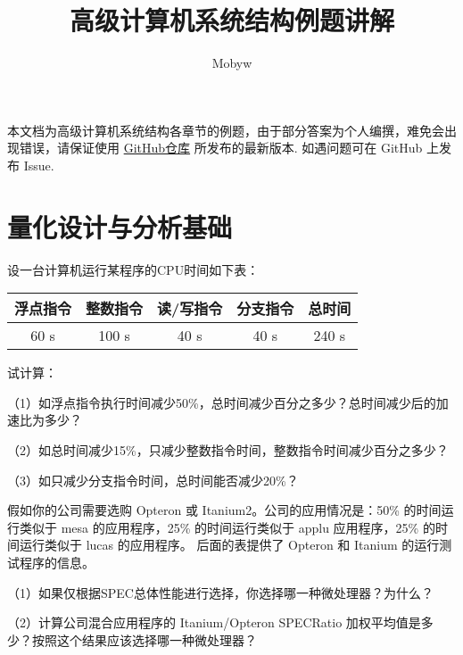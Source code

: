 \documentclass[cn, hazy, blue, normal, 12pt]{elegantnote}
\title{高级计算机系统结构例题讲解}
\author{Mobyw}
\date{\zhtoday}
\begin{document}
\maketitle


\doclicenseThis

本文档为高级计算机系统结构各章节的例题，由于部分答案为个人编撰，难免会出现错误，请保证使用 \href{https://github.com/mobyw/MasterCourseNotes/blob/master/AdvancedComputerSystemArchitecture/AdvancedComputerSystemArchitectureExamples.pdf}{GitHub仓库} 所发布的最新版本. 如遇问题可在 GitHub 上发布 Issue.


\section{量化设计与分析基础}

\begin{exercise}

    设一台计算机运行某程序的CPU时间如下表：

    \begin{table}[htbp]
        \centering
        \notag
        \begin{tabular}{ccccc}
            \hline
            浮点指令 & 整数指令  & 读/写指令 & 分支指令 & 总时间   \\
            \hline
            60 s & 100 s & 40 s  & 40 s & 240 s \\
            \hline
        \end{tabular}
    \end{table}

    试计算：

    （1）如浮点指令执行时间减少50\%，总时间减少百分之多少？总时间减少后的加速比为多少？

    （2）如总时间减少15\%，只减少整数指令时间，整数指令时间减少百分之多少？

    （3）如只减少分支指令时间，总时间能否减少20\%？

\end{exercise}

\begin{solution}[print=true]



\end{solution}

\begin{exercise}

    假如你的公司需要选购 Opteron 或 Itanium2。公司的应用情况是：50\% 的时间运行类似于 mesa 的应用程序，25\% 的时间运行类似于 applu 应用程序，25\% 的时间运行类似于 lucas 的应用程序。 后面的表提供了 Opteron 和 Itanium 的运行测试程序的信息。

    （1）如果仅根据SPEC总体性能进行选择，你选择哪一种微处理器？为什么？

    （2）计算公司混合应用程序的 Itanium/Opteron SPECRatio 加权平均值是多少？按照这个结果应该选择哪一种微处理器？

\end{exercise}
\end{document}
